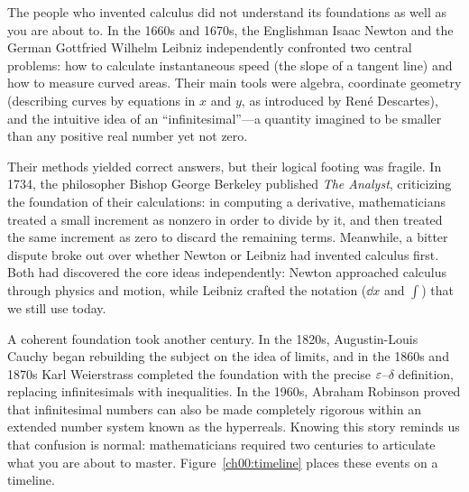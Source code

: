 \begin{historybox}
The people who invented calculus did not understand its foundations as well as you are about to.
In the 1660s and 1670s, the Englishman Isaac Newton and the German Gottfried Wilhelm Leibniz independently
confronted two central problems: how to calculate instantaneous speed (the slope of a tangent line)
and how to measure curved areas. Their main tools were algebra, coordinate geometry (describing curves
by equations in $x$ and $y$, as introduced by Ren\'e Descartes), and the
intuitive idea of an ``infinitesimal''---a quantity imagined to be smaller than any positive real number
yet not zero.

Their methods yielded correct answers, but their logical footing was fragile. In 1734, the philosopher
Bishop George Berkeley published \emph{The Analyst}, criticizing the foundation of their calculations:
in computing a derivative, mathematicians treated a small increment as nonzero in order to divide by it,
and then treated the same increment as zero to discard the remaining terms. Meanwhile, a bitter dispute broke out over
whether Newton or Leibniz had invented calculus first. Both had discovered the core ideas independently:
Newton approached calculus through physics and motion, while Leibniz crafted the notation ($\dd x$ and $\int$)
that we still use today.

A coherent foundation took another century. In the 1820s, Augustin-Louis Cauchy began rebuilding the subject
on the idea of limits, and in the 1860s and 1870s Karl Weierstrass completed the foundation with the precise
$\varepsilon$--$\delta$ definition, replacing infinitesimals with inequalities. In the 1960s, Abraham Robinson proved
that infinitesimal numbers can also be made completely rigorous within an extended number system known as the
hyperreals. Knowing this story reminds us that confusion is normal: mathematicians required two centuries to
articulate what you are about to master. Figure~\ref{ch00:timeline} places these events on a timeline.
\end{historybox}

